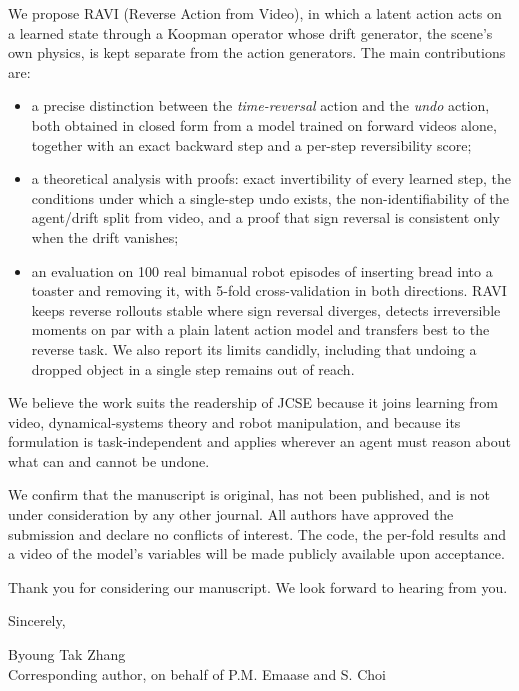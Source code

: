\documentclass[11pt,a4paper]{article}
\begin{document}
We propose RAVI (Reverse Action from Video), in which a latent action acts on a learned state through a Koopman operator whose drift generator, the scene's own physics, is kept separate from the action generators. The main contributions are:
\begin{itemize}\setlength{\itemsep}{1pt}\setlength{\parskip}{0pt}
	\item a precise distinction between the \emph{time-reversal} action and the \emph{undo} action, both obtained in closed form from a model trained on forward videos alone, together with an exact backward step and a per-step reversibility score;
	\item a theoretical analysis with proofs: exact invertibility of every learned step, the conditions under which a single-step undo exists, the non-identifiability of the agent/drift split from video, and a proof that sign reversal is consistent only when the drift vanishes;
	\item an evaluation on 100 real bimanual robot episodes of inserting bread into a toaster and removing it, with 5-fold cross-validation in both directions. RAVI keeps reverse rollouts stable where sign reversal diverges, detects irreversible moments on par with a plain latent action model and transfers best to the reverse task. We also report its limits candidly, including that undoing a dropped object in a single step remains out of reach.
\end{itemize}

We believe the work suits the readership of JCSE because it joins learning from video, dynamical-systems theory and robot manipulation, and because its formulation is task-independent and applies wherever an agent must reason about what can and cannot be undone.

We confirm that the manuscript is original, has not been published, and is not under consideration by any other journal. All authors have approved the submission and declare no conflicts of interest. The code, the per-fold results and a video of the model's variables will be made publicly available upon acceptance.

Thank you for considering our manuscript. We look forward to hearing from you.

Sincerely,

\vspace{6pt}
Byoung Tak Zhang\\
Corresponding author, on behalf of P.M. Emaase and S. Choi
\end{document}

